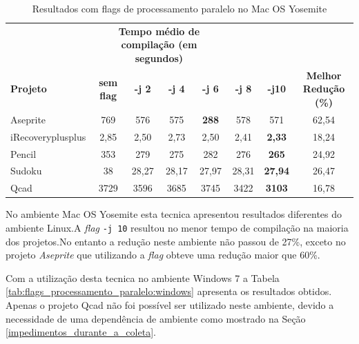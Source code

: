 \begin{table}[!ht]
\tiny
\centering
\caption{Resultados com flags de processamento paralelo no Mac OS Yosemite}
\label{tab:flags_processamento_paralelo:mac_os}
\begin{tabular}{lccccccc}
& \multicolumn{4}{c}{\textbf{Tempo médio de compilação (em segundos)} } \\
\textbf{Projeto} &  \textbf{sem flag} & \textbf{-j 2} & \textbf{-j 4} & \textbf{-j 6} & \textbf{-j 8} & \textbf{-j10} &  \textbf{Melhor Redução (\%)} \\ \toprule
Aseprite          & 769   & 576   & 575   & \textbf{288}  & 578 & 571      &  62,54 \\ 
iRecoveryplusplus & 2,85  & 2,50  & 2,73  &  2,50 &  2,41 &  \textbf{2,33} & 18,24\\ 
Pencil            & 353   & 279   & 275   & 282 & 276     & \textbf{265}   & 24,92 \\ 
Sudoku            &  38   & 28,27 & 28,17 & 27,97 & 28,31 & \textbf{27,94} & 26,47 \\ 
Qcad              & 3729  & 3596  & 3685  & 3745 & 3422   & \textbf{3103}  & 16,78 \\ 
\end{tabular}
\end{table}

No ambiente Mac OS Yosemite esta tecnica apresentou resultados diferentes do ambiente Linux.A \textit{flag} \texttt{-j 10} resultou no menor tempo de compilação na maioria dos projetos.No entanto a redução neste ambiente não passou de 27\%, exceto no projeto \textit{Aseprite} que utilizando a \textit{flag} obteve uma redução maior que 60\%.


Com a utilização desta tecnica no ambiente Windows 7 a Tabela \ref{tab:flags_processamento_paralelo:windows} apresenta os resultados obtidos.
Apenas o projeto Qcad não foi possível ser utilizado neste ambiente, devido a necessidade de uma dependência de ambiente como mostrado na Seção \ref{impedimentos_durante_a_coleta}.


